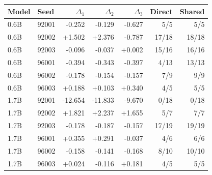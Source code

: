 \begin{tabular}{llrrrrr}\toprule
Model & Seed & $\Delta_1$ & $\Delta_2$ & $\Delta_3$ & Direct & Shared\\\midrule
0.6B & 92001 & -0.252 & -0.129 & -0.627 & 5/5 & 5/5\\
0.6B & 92002 & +1.502 & +2.376 & -0.787 & 17/18 & 18/18\\
0.6B & 92003 & -0.096 & -0.037 & +0.002 & 15/16 & 16/16\\
0.6B & 96001 & -0.394 & -0.343 & -0.397 & 4/13 & 13/13\\
0.6B & 96002 & -0.178 & -0.154 & -0.157 & 7/9 & 9/9\\
0.6B & 96003 & +0.188 & +0.103 & +0.340 & 4/5 & 5/5\\
1.7B & 92001 & -12.654 & -11.833 & -9.670 & 0/18 & 0/18\\
1.7B & 92002 & +1.821 & +2.237 & +1.655 & 5/7 & 7/7\\
1.7B & 92003 & -0.178 & -0.187 & -0.157 & 17/19 & 19/19\\
1.7B & 96001 & +0.355 & +0.291 & -0.037 & 4/6 & 6/6\\
1.7B & 96002 & -0.158 & -0.141 & -0.168 & 8/10 & 10/10\\
1.7B & 96003 & +0.024 & -0.116 & +0.181 & 4/5 & 5/5\\
\bottomrule\end{tabular}
